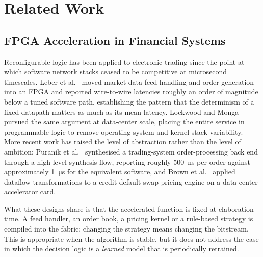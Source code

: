 \documentclass[final,5p,times,twocolumn]{elsarticle}
\begin{document}
\section{Related Work}
\subsection{FPGA Acceleration in Financial Systems}
Reconfigurable logic has been applied to electronic trading since the point at
which software network stacks ceased to be competitive at microsecond
timescales. Leber et al.~\cite{Leber2011} moved market-data feed handling and
order generation into an FPGA and reported wire-to-wire latencies roughly an
order of magnitude below a tuned software path, establishing the pattern that
the determinism of a fixed datapath matters as much as its mean latency.
Lockwood and Monga~\cite{Lockwood2015} pursued the same argument at data-center
scale, placing the entire service in programmable logic to remove operating
system and kernel-stack variability. More recent work has raised the level of
abstraction rather than the level of ambition: Puranik et
al.~\cite{Puranik2023} synthesised a trading-system order-processing back end
through a high-level synthesis flow, reporting roughly \SI{500}{\nano\second} per
order against approximately \SI{1}{\micro\second} for the equivalent software,
and Brown et al.~\cite{Brown2021} applied dataflow transformations to a
credit-default-swap pricing engine on a data-center accelerator card.

What these designs share is that the accelerated function is fixed at
elaboration time. A feed handler, an order book, a pricing kernel or a
rule-based strategy is compiled into the fabric; changing the strategy means
changing the bitstream. This is appropriate when the algorithm is stable, but it
does not address the case in which the decision logic is a \emph{learned} model
that is periodically retrained.
\end{document}

